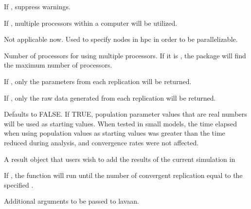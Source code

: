 \documentclass[a4paper]{book}
\begin{document}
\begin{Arguments}
\begin{ldescription}
\item[\code{silent}]  
If , suppress warnings.

\item[\code{multicore}]  
If , multiple processors within a computer will be utilized.

\item[\code{cluster}]  
Not applicable now. Used to specify nodes in hpc in order to be parallelizable.

\item[\code{numProc}]  
Number of processors for using multiple processors. If it is , the package will find the maximum number of processors.

\item[\code{paramOnly}]  
If , only the parameters from each replication will be returned.

\item[\code{dataOnly}]  
If , only the raw data generated from each replication will be returned.

\item[\code{smartStart}] 
Defaults to FALSE. If TRUE, population parameter values that are real numbers will be used as starting values. When tested in small models, the time elapsed when using population values as starting values was greater than the time reduced during analysis, and convergence rates were not affected. 

\item[\code{previousSim}] 
A result object that users wish to add the results of the current simulation in

\item[\code{completeRep}] 
If , the function will run until the number of convergent replication equal to the specified .

\item[\code{...}]  
Additional arguments to be passed to lavaan.

\end{ldescription}
\end{Arguments}
%
\end{document}
